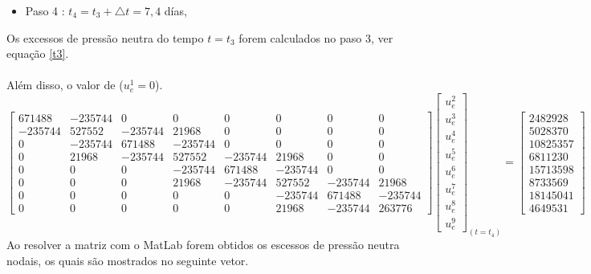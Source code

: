 \documentclass{article} %
\begin{document}
\begin{itemize}
	\item Paso 4 : \(t_4=t_3+\triangle t=7,4\) días,
\end{itemize}

Os excessos de pressão neutra do tempo \(t=t_3\) forem calculados no paso 3, ver equação \ref{t3}.\\
\\
\indent Além disso, o valor de (\(u_e^1=0\)).\\

\begin{equation*}
\begin{bmatrix}
671488& -235744& 0& 0& 0& 0& 0& 0\\
-235744&527552&-235744&21968& 0& 0& 0& 0\\
0&-235744&671488&-235744& 0& 0& 0& 0\\
0&21968&-235744&527552&-235744&21968& 0& 0\\
0&0&0& -235744&671488&-235744& 0& 0\\
0&0&0&21968&-235744&527552&-235744&21968\\
0&0&0&0&0&-235744&671488&-235744\\
0&0&0&0&0&21968&-235744&263776
\end{bmatrix}\begin{bmatrix}
u_e^2\\
u_e^3\\
u_e^4\\
u_e^5\\
u_e^6\\
u_e^7\\
u_e^8\\
u_e^9
\end{bmatrix}_{(t=t_4)}
=\begin{bmatrix}
2482928\\
5028370\\
10825357\\
6811230\\
15713598\\
8733569\\
18145041\\
4649531
\end{bmatrix}
\end{equation*}
\indent Ao resolver a matriz com o MatLab forem obtidos os escessos de pressão neutra nodais, os quais são mostrados no seguinte vetor.
\end{document}
